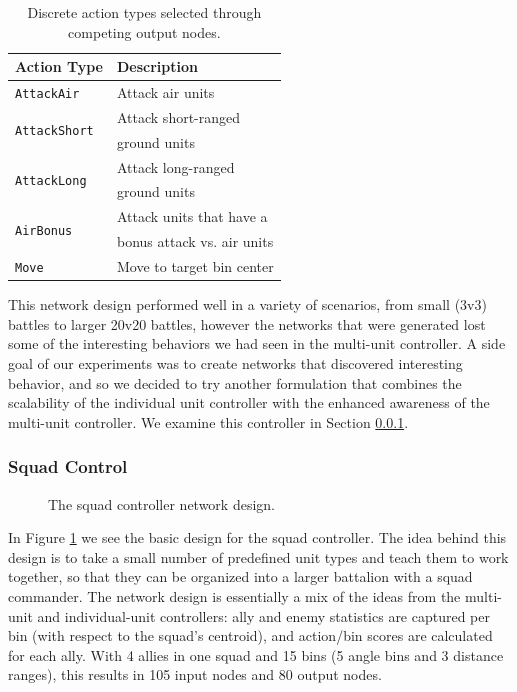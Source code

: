 \documentclass[10pt,a4paper,twocolumn]{article}
\begin{document}
\begin{table}
\centering
\begin{tabular}{|l|l|}
	\hline
	{\bf Action Type} & {\bf Description}\\ \hline
	\texttt{AttackAir} & Attack air units\\ \hline
	\multirow{2}{*}{\texttt{AttackShort}} & Attack short-ranged \\
	& ground units\\ \hline
	\multirow{2}{*}{\texttt{AttackLong}} & Attack long-ranged \\ 
	& ground units\\ \hline
	\multirow{2}{*}{\texttt{AirBonus}} & Attack units that have a \\
	& bonus attack vs. air units\\ \hline
	\texttt{Move} & Move to target bin center\\ \hline
\end{tabular}
\caption{Discrete action types selected through competing output nodes.}
\label{tab:actions}
\end{table}

This network design performed well in a variety of scenarios, from small (3v3) battles to larger 20v20 battles, however the networks that were generated lost some of the interesting behaviors we had seen in the multi-unit controller. A side goal of our experiments was to create networks that discovered interesting behavior, and so we decided to try another formulation that combines the scalability of the individual unit controller with the enhanced awareness of the multi-unit controller. We examine this controller in Section \ref{sec:squad_design}.

\subsubsection{Squad Control}
\label{sec:squad_design}

\begin{figure}

\caption{The squad controller network design.}
\label{fig:squad_design}
\end{figure}

In Figure \ref{fig:squad_design} we see the basic design for the squad controller. The idea behind this design is to take a small number of predefined unit types and teach them to work together, so that they can be organized into a larger battalion with a squad commander. The network design is essentially a mix of the ideas from the multi-unit and individual-unit controllers: ally and enemy statistics are captured per bin (with respect to the squad's centroid), and action/bin scores are calculated for each ally. With 4 allies in one squad and 15 bins (5 angle bins and 3 distance ranges), this results in 105 input nodes and 80 output nodes.
\end{document}
